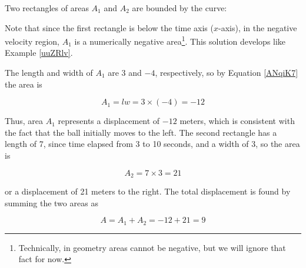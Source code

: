 \documentclass[main.tex]{subfiles}
\begin{document}
\Solution Two rectangles of areas $A_1$ and $A_2$ are bounded by the curve:

\begin{center}
\end{center}

Note that since the first rectangle is below the time axis ($x$-axis), in the negative velocity region, $A_1$ is a numerically negative area\footnote{Technically, in geometry areas cannot be negative, but we will ignore that fact for now.}. This solution develops like Example \ref{uuZRlv}. 

\vspace{1em}

The length and width of $A_1$ are 3 and $-4$, respectively, so by Equation \eqref{ANqiK7} the area is

\begin{equation*}
    A_1 = l w = 3\times (-4) = -12
\end{equation*}

Thus, area $A_1$ represents a displacement of $-12$ meters, which is consistent with the fact that the ball initially moves to the left. The second rectangle has a length of 7, since time elapsed from 3 to 10 seconds, and a width of 3, so the area is 

\begin{equation*}
    A_2 = 7 \times 3 = 21  
\end{equation*}

or a displacement of 21 meters to the right. The total displacement is found by summing the two areas as

\begin{equation*}
    A = A_1 + A_2 = -12 + 21 = 9
\end{equation*}
\end{document}
